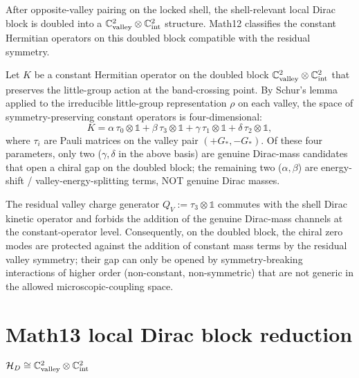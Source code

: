 After opposite-valley pairing on the locked shell, the shell-relevant
local Dirac block is doubled into a $\mathbb{C}^2_{\rm valley}
\otimes \mathbb{C}^2_{\rm int}$ structure. Math12 classifies the
constant Hermitian operators on this doubled block compatible with
the residual symmetry.

\begin{lemma}
\label{lem:Math12-mass-classification}
Let $K$ be a constant Hermitian operator on the doubled block
$\mathbb{C}^2_{\rm valley} \otimes \mathbb{C}^2_{\rm int}$ that
preserves the little-group action at the band-crossing point.
By Schur's lemma applied to the irreducible little-group
representation $\rho$ on each valley, the space of
symmetry-preserving constant operators is four-dimensional:
\[
K = \alpha\, \tau_0 \otimes \mathbb{1} + \beta\, \tau_3 \otimes
\mathbb{1} + \gamma\, \tau_1 \otimes \mathbb{1} + \delta\, \tau_2
\otimes \mathbb{1},
\]
where $\tau_i$ are Pauli matrices on the valley pair $(+G_*,
-G_*)$. Of these four parameters, only two ($\gamma, \delta$ in the
above basis) are genuine Dirac-mass candidates that open a chiral gap
on the doubled block; the remaining two ($\alpha, \beta$) are
energy-shift / valley-energy-splitting terms, NOT genuine Dirac
masses.
\end{lemma}

\begin{theorem}
\label{thm:Math12-protection}
The residual valley charge generator $Q_V := \tau_3 \otimes
\mathbb{1}$ commutes with the shell Dirac kinetic operator and
forbids the addition of the genuine Dirac-mass channels at the
constant-operator level. Consequently, on the doubled block, the
chiral zero modes are protected against the addition of constant
mass terms by the residual valley symmetry; their gap can only be
opened by symmetry-breaking interactions of higher order
(non-constant, non-symmetric) that are not generic in the allowed
microscopic-coupling space.
\end{theorem}

\section{Math13 local Dirac block reduction
$\mathcal{H}_D \cong \mathbb{C}^2_{\rm valley}
\otimes \mathbb{C}^2_{\rm int}$}\label{sec:Math13}

